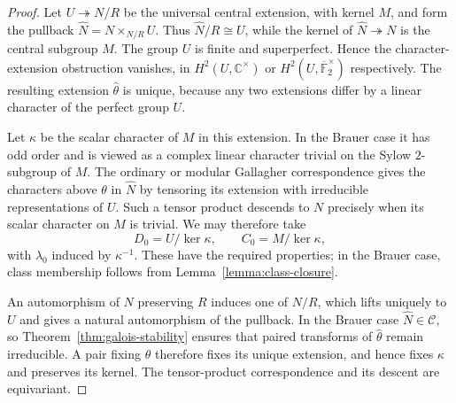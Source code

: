 \documentclass[11pt,a4paper]{amsart}
\theoremstyle{remark}
\numberwithin{equation}{section}
\begin{document}
\begin{proof}
Let $U\twoheadrightarrow N/R$ be the universal central extension, with
kernel $M$, and form the pullback $\widehat N=N\times_{N/R}U$.
Thus $\widehat N/R\cong U$, while the kernel of
$\widehat N\twoheadrightarrow N$ is the central subgroup $M$.
The group $U$ is finite and superperfect. Hence the character-extension
obstruction vanishes, in $H^2(U,\mathbb C^\times)$ or
$H^2(U,\overline{\mathbb F}_2^\times)$ respectively. The resulting
extension $\widehat\theta$ is unique, because any two extensions differ
by a linear character of the perfect group $U$.

Let $\kappa$ be the scalar character of $M$ in this extension. In the
Brauer case it has odd order and is viewed as a complex linear character
trivial on the Sylow $2$-subgroup of $M$. The ordinary or modular Gallagher
correspondence gives the characters above $\theta$ in $\widehat N$ by
tensoring its extension with irreducible representations of $U$. Such a
tensor product descends to $N$ precisely when its scalar character on
$M$ is trivial. We may therefore take
\[
 D_0=U/\ker\kappa,\qquad C_0=M/\ker\kappa,
\]
with $\lambda_0$ induced by $\kappa^{-1}$. These have the required
properties; in the Brauer case, class membership follows from
Lemma~\ref{lemma:class-closure}.

An automorphism of $N$ preserving $R$ induces one of $N/R$, which
lifts uniquely to $U$ and gives a natural automorphism of the pullback.
In the Brauer case $\widehat N\in\mathcal C$,
so Theorem~\ref{thm:galois-stability} ensures that paired transforms of
$\widehat\theta$ remain irreducible. A pair fixing $\theta$ therefore
fixes its unique extension, and hence fixes $\kappa$ and preserves its
kernel. The tensor-product correspondence and its descent are equivariant.
\end{proof}
\end{document}
